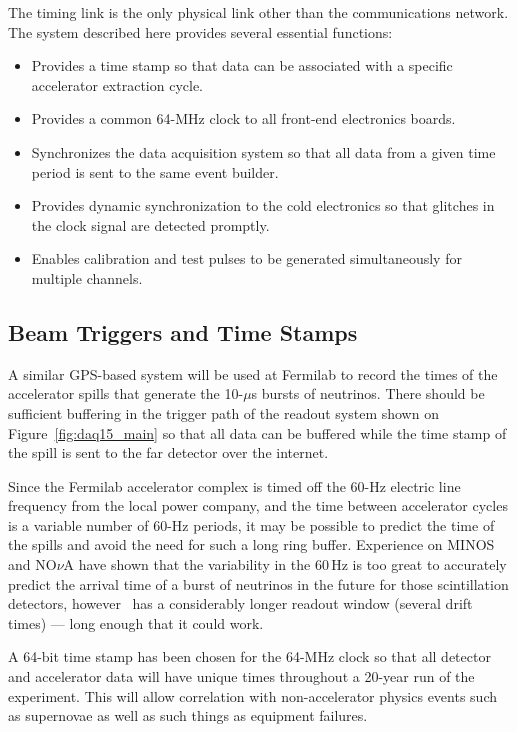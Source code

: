 The timing link is the only physical link other than the
communications network.  The system described here
provides several essential functions: 
\begin{itemize}
\item Provides a time stamp so that data can be associated with a
  specific accelerator extraction cycle.
\item Provides a common 64-MHz clock to all front-end electronics
  boards.
\item Synchronizes the data acquisition system so that all data from a
  given time period is sent to the same event builder.
\item Provides dynamic synchronization to the cold electronics so that
  glitches in the clock signal are detected promptly.
\item Enables calibration and test pulses to be generated
  simultaneously for multiple channels.
\end{itemize}

\subsection{Beam Triggers and Time Stamps}

A similar GPS-based system will be used at Fermilab to record the times
of the accelerator spills that generate the 10-$\mu$s bursts of
neutrinos.  There should be 
sufficient buffering in the trigger path
of the readout system shown on Figure~\ref{fig:daq15_main} so that all
data can be buffered while the time stamp of the spill is
sent to the far detector over the internet.

Since the Fermilab accelerator complex is timed off the 60-Hz electric
line frequency from the local power company, and the time between
accelerator cycles is a variable number of 60-Hz periods, it may be
possible to predict the time of the spills and avoid the need for such
a long ring buffer.  Experience on MINOS and NO$\nu$A have shown that the
variability in the 60\,Hz is too great to accurately predict the
arrival time of a burst of neutrinos in the future for those scintillation detectors, 
however \LBNE\ has a
considerably longer readout window (several drift times) --- %
long enough that it
could work.%

A 64-bit time stamp has been chosen for the 64-MHz clock so that all
detector and accelerator data will have unique times throughout a 20-year
run of the experiment.  This will allow correlation with
non-accelerator physics events such as supernovae as well as such
things as equipment failures.

